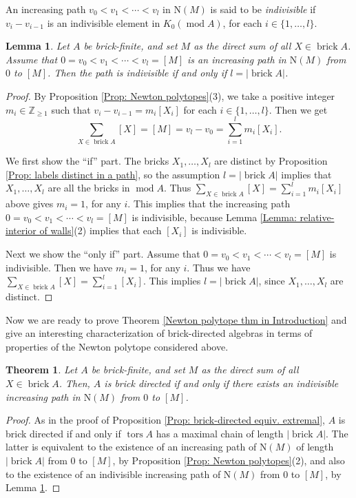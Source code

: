 \documentclass{amsart}
\theoremstyle{thmstyle}
\newtheorem{theorem}[thm]{Theorem}
\newtheorem{lemma}[thm]{Lemma}
\theoremstyle{exstyle}
\theoremstyle{defstyle}
\theoremstyle{remstyle}
\theoremstyle{remstyle}
\DeclareMathOperator*{\modu}{mod}
\DeclareMathOperator*{\brick}{brick}
\DeclareMathOperator*{\tors}{tors}
\begin{document}
An increasing path $v_0<v_1<\cdots<v_l$ in $\mathrm{N}(M)$ is said to be \emph{indivisible} if $v_i-v_{i-1}$ is an indivisible element in $K_0(\modu A)$, for each $i \in \{1,\ldots,l\}$. 

\begin{lemma}\label{Lemma: indivisible paths}
Let $A$ be brick-finite, and set $M$ as the direct sum of all $X \in \brick A$. Assume that $0=v_0<v_1<\cdots<v_l=[M]$ is an increasing path in $\mathrm{N}(M)$ from $0$ to $[M]$. Then the path is indivisible if and only if $l=|{\brick A}|$.
\end{lemma}

\begin{proof}
By Proposition \ref{Prop: Newton polytopes}(3), we take a positive integer $m_i \in \mathbb{Z}_{\ge 1}$ such that $v_i-v_{i-1}=m_i[X_i]$ for each $i \in \{1,\ldots,l\}$. Then we get 
$$\sum_{X \in \brick A}[X]=[M]=v_l-v_0=\sum_{i=1}^l m_i[X_i] .$$

We first show the ``if'' part. The bricks $X_1,\ldots,X_l$ are distinct by Proposition \ref{Prop: labels distinct in a path}, so the assumption $l=|{\brick A}|$ implies that $X_1,\ldots,X_l$ are all the bricks in $\modu A$. Thus $\sum_{X \in \brick A}[X]=\sum_{i=1}^l m_i[X_i]$ above gives $m_i=1$, for any $i$. This implies that the increasing path $0=v_0<v_1<\cdots<v_l=[M]$ is indivisible, because Lemma \ref{Lemma: relative-interior of walls}(2) implies that each $[X_i]$ is indivisible.

Next we show the ``only if'' part. Assume that $0=v_0<v_1<\cdots<v_l=[M]$ is indivisible. Then we have $m_i=1$, for any $i$. Thus we have $\sum_{X \in \brick A}[X]=\sum_{i=1}^l [X_i]$. This implies $l=|{\brick A}|$, since $X_1,\ldots,X_l$ are distinct.
\end{proof}

Now we are ready to prove Theorem \ref{Newton polytope thm in Introduction} and give an interesting characterization of brick-directed algebras in terms of properties of the Newton polytope considered above.

\begin{theorem}\label{Thm: Newton polytope}
Let $A$ be brick-finite, and set $M$ as the direct sum of all $X \in \brick A$. Then, $A$ is brick directed if and only if 
there exists an indivisible increasing path in $\mathrm{N}(M)$ from $0$ to $[M]$.
\end{theorem}

\begin{proof}
As in the proof of Proposition \ref{Prop: brick-directed equiv. extremal}, $A$ is brick directed if and only if $\tors A$ has a maximal chain of length $|{\brick A}|$. The latter is equivalent to the existence of an increasing path of $\mathrm{N}(M)$ of length $|{\brick A}|$ from $0$ to $[M]$, by Proposition \ref{Prop: Newton polytopes}(2), and also to the existence of an indivisible increasing path of $\mathrm{N}(M)$ from $0$ to $[M]$, by Lemma \ref{Lemma: indivisible paths}.
\end{proof}
\end{document}
